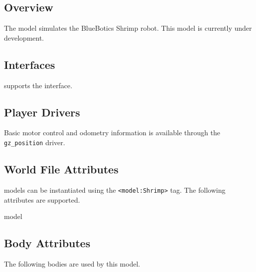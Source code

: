 
\subsection{Overview}

The {\tt \modelName} model simulates the BlueBotics Shrimp robot. This model is currently under development.

\subsection{\libgazebo Interfaces}

{\tt \modelName} supports the  interface.


\subsection{Player Drivers}

Basic motor control and odometry information is available through the
{\tt gz\_position} driver.


\subsection{World File Attributes}

{\tt \modelName} models can be instantiated using the
\verb+<model:Shrimp>+ tag.  The following attributes are
supported.

\begin{xmlattrtable}{model}{\modelName}
\modeldefaults
\end{xmlattrtable}

\subsection{Body Attributes}

The following bodies are used by this model.

\begin{bodyattrtable}
\bodydefaults
\end{bodyattrtable}
